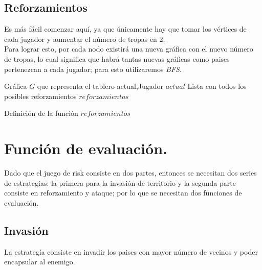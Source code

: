 \documentclass[12pt,twocolumn,draft]{article}
\begin{document}
\subsection{Reforzamientos}

Es m\'as f\'acil comenzar aqu\'i, ya que \'unicamente hay que tomar los v\'ertices de cada jugador
y aumentar el n\'umero de tropas en 2.\\

Para lograr esto, por cada nodo existir\'a una nueva gr\'afica con el nuevo n\'umero de tropas, lo
cual significa que habr\'a tantas nuevas gr\'aficas como paises pertenezcan a cada jugador; para
esto utilizaremos \textit{BFS}.

\begin{algorithm}
\begin{algorithmic}[1]
\REQUIRE Gr\'afica $G$ que representa el tablero actual,Jugador $actual$
\ENSURE Lista con todos los posibles reforzamientos
\ENDFOR
{}
\ENDIF
\ENDFOR
\ENDWHILE
\RETURN $reforzamientos$
\end{algorithmic}
\caption{Definici\'on de la funci\'on $reforzamientos$}
\label{reforzamientos}
\end{algorithm}

\section{Funci\'on de evaluaci\'on.}

Dado que el juego de risk consiste en dos partes, entonces se necesitan dos series de estrategias: la
primera para la invasi\'on de territorio y la segunda parte consiste en reforzamiento y ataque;
por lo que se necesitan dos funciones de evaluaci\'on.

\subsection{Invasi\'on}

La estrateg\'ia consiste en invadir los paises con mayor n\'umero de vecinos y poder encapsular al enemigo.
\end{document}
